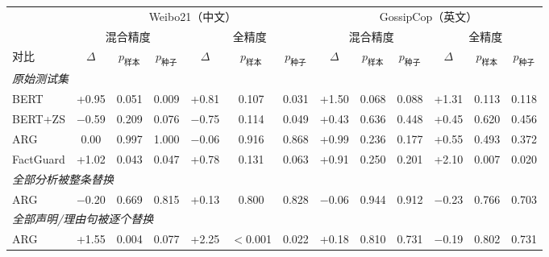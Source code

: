 \begin{tabular}{lcccccccccccc}
\toprule
 & \multicolumn{6}{c}{Weibo21（中文）} & \multicolumn{6}{c}{GossipCop（英文）} \\
\cmidrule(lr){2-7}\cmidrule(lr){8-13}
 & \multicolumn{3}{c}{混合精度} & \multicolumn{3}{c}{全精度} & \multicolumn{3}{c}{混合精度} & \multicolumn{3}{c}{全精度} \\
\cmidrule(lr){2-4}\cmidrule(lr){5-7}\cmidrule(lr){8-10}\cmidrule(lr){11-13}
\method{} 对比 & $\Delta$ & $p_{\text{样本}}$ & $p_{\text{种子}}$ & $\Delta$ & $p_{\text{样本}}$ & $p_{\text{种子}}$ & $\Delta$ & $p_{\text{样本}}$ & $p_{\text{种子}}$ & $\Delta$ & $p_{\text{样本}}$ & $p_{\text{种子}}$ \\
\midrule
\multicolumn{13}{l}{\emph{原始测试集}} \\
BERT & +0.95 & 0.051 & 0.009 & +0.81 & 0.107 & 0.031 & +1.50 & 0.068 & 0.088 & +1.31 & 0.113 & 0.118 \\
BERT+ZS & $-$0.59 & 0.209 & 0.076 & $-$0.75 & 0.114 & 0.049 & +0.43 & 0.636 & 0.448 & +0.45 & 0.620 & 0.456 \\
ARG & 0.00 & 0.997 & 1.000 & $-$0.06 & 0.916 & 0.868 & +0.99 & 0.236 & 0.177 & +0.55 & 0.493 & 0.372 \\
FactGuard & +1.02 & 0.043 & 0.047 & +0.78 & 0.131 & 0.063 & +0.91 & 0.250 & 0.201 & +2.10 & 0.007 & 0.020 \\
\midrule
\multicolumn{13}{l}{\emph{全部分析被整条替换}} \\
ARG & $-$0.20 & 0.669 & 0.815 & +0.13 & 0.800 & 0.828 & $-$0.06 & 0.944 & 0.912 & $-$0.23 & 0.766 & 0.703 \\
\midrule
\multicolumn{13}{l}{\emph{全部声明/理由句被逐个替换}} \\
ARG & +1.55 & 0.004 & 0.077 & +2.25 & $<$0.001 & 0.022 & +0.18 & 0.810 & 0.731 & $-$0.19 & 0.802 & 0.731 \\
\bottomrule
\end{tabular}
